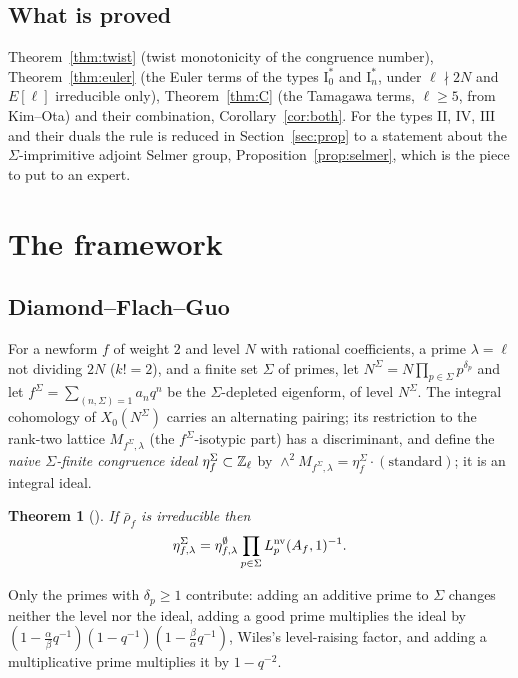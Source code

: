 \documentclass[11pt]{amsart}
\newtheorem{theorem}{Theorem}[section]
\theoremstyle{definition}
\begin{document}
\subsection{What is proved}
Theorem~\ref{thm:twist} (twist monotonicity of the congruence number), Theorem~\ref{thm:euler} (the Euler terms of the types $\mathrm{I}_0^*$ and $\mathrm{I}_n^*$, under $\ell\nmid 2N$ and $E[\ell]$ irreducible only), Theorem~\ref{thm:C} (the Tamagawa terms, $\ell\ge5$, from Kim--Ota) and their combination, Corollary~\ref{cor:both}. For the types $\mathrm{II}$, $\mathrm{IV}$, $\mathrm{III}$ and their duals the rule is reduced in Section~\ref{sec:prop} to a statement about the $\Sigma$-imprimitive adjoint Selmer group, Proposition~\ref{prop:selmer}, which is the piece to put to an expert.

\section{The framework}\label{sec:framework}

\subsection{Diamond--Flach--Guo}
For a newform $f$ of weight $2$ and level $N$ with rational coefficients, a prime $\lambda=\ell$ not dividing $2N$ ($k!=2$), and a finite set $\Sigma$ of primes, let $N^\Sigma=N\prod_{p\in\Sigma}p^{\delta_p}$ and let $f^\Sigma=\sum_{(n,\Sigma)=1}a_nq^n$ be the $\Sigma$-depleted eigenform, of level $N^\Sigma$. The integral cohomology of $X_0(N^\Sigma)$ carries an alternating pairing; its restriction to the rank-two lattice $M_{f^\Sigma,\lambda}$ (the $f^\Sigma$-isotypic part) has a discriminant, and \cite[\S1.7.3]{DFG04} define the \emph{naive $\Sigma$-finite congruence ideal} $\eta_f^\Sigma\subset\mathbb{Z}_\ell$ by $\wedge^2M_{f^\Sigma,\lambda}=\eta_f^\Sigma\cdot(\text{standard})$; it is an integral ideal.

\begin{theorem}[{\cite[Proposition 1.4(c)]{DFG04}}]\label{thm:dfg14}
If $\bar\rho_f$ is irreducible then
\[
\eta^\Sigma_{f,\lambda}=\eta^{\emptyset}_{f,\lambda}\prod_{p\in\Sigma}L_p^{\mathrm{nv}}(A_f,1)^{-1}.
\]
\end{theorem}
Only the primes with $\delta_p\ge1$ contribute: adding an additive prime to $\Sigma$ changes neither the level nor the ideal, adding a good prime multiplies the ideal by $(1-\frac\alpha\beta q^{-1})(1-q^{-1})(1-\frac\beta\alpha q^{-1})$, Wiles's level-raising factor, and adding a multiplicative prime multiplies it by $1-q^{-2}$.
\end{document}
